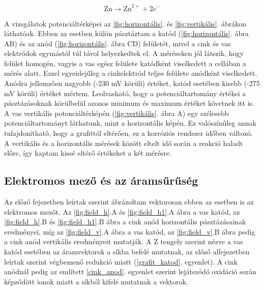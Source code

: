 \begin{equation}
\textrm{Zn} \longrightarrow \textrm{Zn}^{2+} + 2e^- 
\label{cink_anod}
\end{equation}


A vizsgálatok potenciáltérképei az \ref{fig:horizontális}. és \ref{fig:vertikális}. ábrákon láthatóak. Ebben az esetben külön pásztáztam a katód (\ref{fig:horizontális}. ábra AB) és az anód (\ref{fig:horizontális}. ábra CD) felületét, mivel a cink és vas elektródok egymástól túl távol helyezkedtek el. A méréseken jól látszik, hogy felület homogén, vagyis a vas egész felülete katódként viselkedett a cellában a mérés alatt. Ezzel egyeidejűleg a cinkelektród teljes felülete anódként viselkedett. Anódra jellemzően nagyobb (-230 mV körüli) értéket, katód esetében kisebb (-275 mV körüli) értéket mértem. Leolvasható, hogy a potenciáltartomány értékei a pásztázásoknak körülbelül azonos minimum és maximum értéket követnek itt is. A vas vertikális potenciáltérképén (\ref{fig:vertikális}. ábra A) egy szélesebb potenciáltartományt láthatunk, mint a horizontális képén. Ez valószínűleg annak tulajdonítható, hogy a grafittól eltérően, ez a korróziós rendszer időben változó. A vertikális és a horizontális mérések között eltelt idő során a reakció haladt előre, így kaptam kissé eltérő értékeket a két mérésre. 

\subsection{Elektromos mező és az áramsűrűség}

Az előző fejezetben leírtak szerint ábrázoltam vektorosan ebben az esetben is az elektromos mezőt. Az \ref{fig:field_h}.A és \ref{fig:field_h1}.A ábra a vas katód, az \ref{fig:field_h}.B és \ref{fig:field_h1}.B ábra a cink anód horizontális pásztázásainak eredményei, míg az \ref{fig:field_v}.A ábra a vas katód, az \ref{fig:field_v}.B ábra pedig a cink anód vertikális eredményeit mutatják. A Z tengely szerint nézve a vas katód esetében az áramvektorok a síkba befelé mutatnak, az előző alfejezetben leírtak szerint végbemenő redukció miatt (\ref{grafit_katod}. egyenlet). A cink anódnál pedig az említett \ref{cink_anod}. egyenlet szerint lejátszódó oxidáció során képződött ionok miatt a síkból kifelé mutatnak a vektorok.

